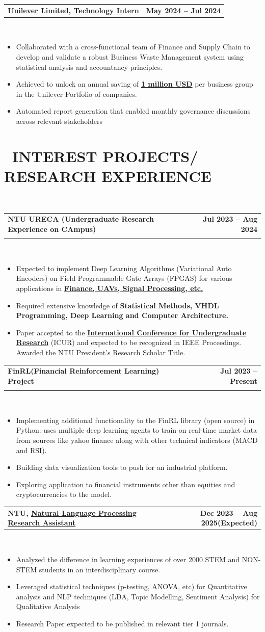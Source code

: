 \documentclass[10pt,a4paper]{article}
\makeatletter
\newcommand{\cvsectionfontsize}{13}
\newcommand{\cvtaglinefirstfontsize}{12}
\newcommand{\cvtaglinesecondfontsize}{12}
\newcommand{\cvbulletfontsize}{11}
\newcommand{\cvsection}[3][.9em]{
  \vspace{-2.7em}
  \section[#3]{\textbf{\scalebox{.68}{\faIcon{#2}}~\fontsize{\cvsectionfontsize}{\cvsectionfontsize}\selectfont\MakeUppercase{#3}}}
  \vspace{-1.8em}
  \noindent\makebox[\textwidth]{\rule{\textwidth}{0.4pt}}
  \\
  \vspace{#1}
}
\newcommand{\cvtagline}[5][1em]{
  \vspace{-1em}
  \noindent\begin{tabularx}{\textwidth}{@{}Xr@{}}
    {\fontsize{\cvtaglinefirstfontsize}{\cvtaglinefirstfontsize}\selectfont\textbf{#2}} & 
    {\fontsize{\cvtaglinefirstfontsize}{\cvtaglinefirstfontsize}\selectfont\textbf{#3}} \\
    \vspace{-0.7em}
    {\fontsize{\cvtaglinesecondfontsize}{\cvtaglinesecondfontsize}\selectfont{#4}} & 
    {\fontsize{\cvtaglinesecondfontsize}{\cvtaglinesecondfontsize}\selectfont\textit{#5}} \\
  \end{tabularx}
  \\
  \vspace{#1}
}
\newcommand{\cvsingletagline}[3][0.5em]{
  \vspace{-1em}
  \noindent\begin{tabularx}{\textwidth}{@{}Xr}
    {\fontsize{\cvtaglinefirstfontsize}{\cvtaglinefirstfontsize}\selectfont\textbf{#2}} & 
    {\fontsize{\cvtaglinefirstfontsize}{\cvtaglinefirstfontsize}\selectfont\textbf{#3}} \\
  \end{tabularx}
  \\
  \vspace{#1}
}
\newcommand{\cvbullets}[2][1em]{
  \vspace{-1.9em}
  {\fontsize{\cvbulletfontsize}{\cvbulletfontsize}\selectfont
    \begin{itemize}[left=0pt,labelsep=1em]
      \setlength\itemsep{0.1em}
      \setlength\labelwidth{1em}
      \setlength\parskip{0pt}
      \setlength{\baselineskip}{1.25\baselineskip}
      
      #2
    \end{itemize}
  }
  \vspace{#1}
}
\makeatother
\begin{document}
\cvsingletagline{Unilever Limited, \underline{Technology Intern}}{May 2024 – Jul 2024}
\cvbullets{
  \item Collaborated with a cross-functional team of Finance and Supply Chain to develop and validate a robust Business Waste Management system using statistical analysis and accountancy principles.
  \item Achieved to unlock an annual saving of \underline{\textbf{ 1 million USD}} per business group in the Unilever Portfolio of companies.
  \item Automated report generation that enabled monthly governance discussions across relevant stakeholders
}

\cvsection{code}{Interest Projects/ Research Experience}

\cvtagline{NTU URECA (Undergraduate Research Experience on CAmpus)}{Jul 2023 – Aug 2024}{URECA Project: \textbf{\textit{Deep Learning on FPGAs}}}{}
\cvbullets{
  \item Expected to implement Deep Learning Algorithms (Variational Auto Encoders) on Field Programmable Gate Arrays (FPGAS) for various applications in \textbf{\underline{Finance, UAVs, Signal Processing, etc.}}
  \item Required extensive knowledge of \textbf{Statistical Methods, VHDL Programming, Deep Learning and Computer Architecture.}
  \item Paper accepted to the \textbf{\underline{ International Conference for Undergraduate Research}} (ICUR) and expected to be recognized in IEEE Proceedings. Awarded the NTU President's Research Scholar Title.
}

\cvtagline{FinRL(Financial Reinforcement Learning) Project}{Jul 2023 – Present}{Deep Reinforcement Learning for trading/portfolio rebalancing}{}
\cvbullets{
  \item Implementing additional functionality to the FinRL library (open source) in Python: uses multiple deep learning agents to train on real-time market data from sources like yahoo finance along with other technical indicators (MACD and RSI).
  \item Building data visualization tools to push for an industrial platform.
  \item Exploring application to financial instruments other than equities and cryptocurrencies to the model.
}

\cvsingletagline{NTU, \underline{Natural Language Processing Research Assistant}}{Dec 2023 – Aug 2025(Expected)}
\cvbullets{
  \item Analyzed the difference in learning experiences of over 2000 STEM and NON-STEM students in an interdisciplinary course.
  \item Leveraged statistical techniques (p-testing, ANOVA, etc) for Quantitative analysis and NLP techniques (LDA, Topic Modelling, Sentiment Analysis) for Qualitative Analysis
  \item Research Paper expected to be published in relevant tier 1 journals.
}
\end{document}

